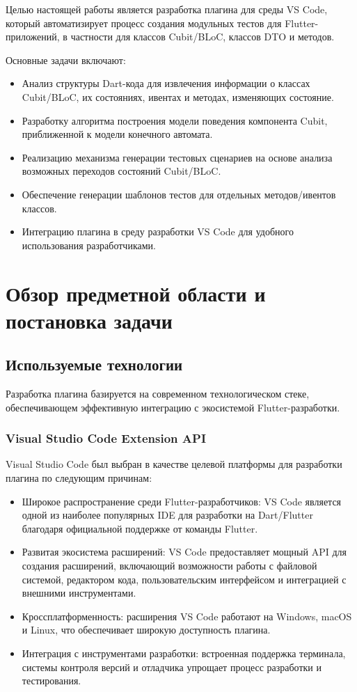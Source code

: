 \documentclass[14pt, russian]{scrartcl}
\begin{document}
Целью настоящей работы является разработка плагина для среды VS Code, который автоматизирует процесс создания модульных тестов для Flutter-приложений, в частности для классов Cubit/BLoC, классов DTO и методов.

Основные задачи включают:
\begin{itemize}
    \item Анализ структуры Dart-кода для извлечения информации о классах Cubit/BLoC, их состояниях, ивентах и методах, изменяющих состояние.
    \item Разработку алгоритма построения модели поведения компонента Cubit, приближенной к модели конечного автомата.
    \item Реализацию механизма генерации тестовых сценариев на основе анализа возможных переходов состояний Cubit/BLoC.
    \item Обеспечение генерации шаблонов тестов для отдельных методов/ивентов классов.
    \item Интеграцию плагина в среду разработки VS Code для удобного использования разработчиками.
\end{itemize}

\section{Обзор предметной области и постановка задачи}

\subsection{Используемые технологии}

Разработка плагина базируется на современном технологическом стеке, обеспечивающем эффективную интеграцию с экосистемой Flutter-разработки.

\subsubsection{Visual Studio Code Extension API}

Visual Studio Code был выбран в качестве целевой платформы для разработки плагина по следующим причинам:
\begin{itemize}
    \item Широкое распространение среди Flutter-разработчиков: VS Code является одной из наиболее популярных IDE для разработки на Dart/Flutter благодаря официальной поддержке от команды Flutter.
    \item Развитая экосистема расширений: VS Code предоставляет мощный API для создания расширений, включающий возможности работы с файловой системой, редактором кода, пользовательским интерфейсом и интеграцией с внешними инструментами.
    \item Кроссплатформенность: расширения VS Code работают на Windows, macOS и Linux, что обеспечивает широкую доступность плагина.
    \item Интеграция с инструментами разработки: встроенная поддержка терминала, системы контроля версий и отладчика упрощает процесс разработки и тестирования.
\end{itemize}
\end{document}

